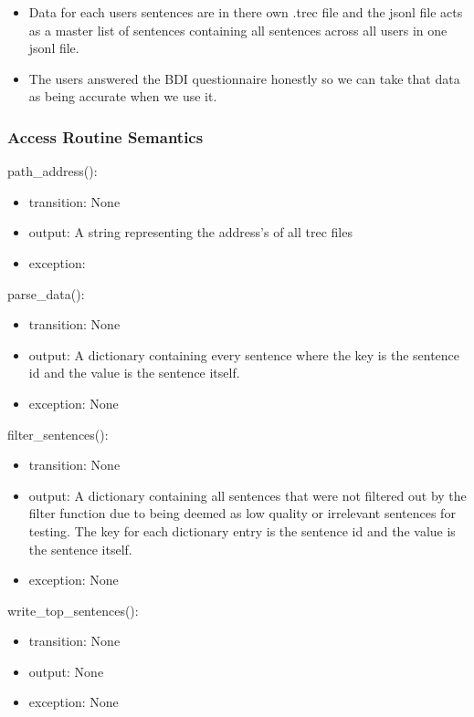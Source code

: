 \documentclass[12pt, titlepage]{article}
\begin{document}
\begin{itemize}
\item Data for each users sentences are in there own .trec file and the jsonl file acts as a master list of sentences containing all sentences across all users in one jsonl file.
\item The users answered the BDI questionnaire honestly so we can take that data as being accurate when we use it. 
\end{itemize}

\subsubsection{Access Routine Semantics}

\noindent path\_address():
\begin{itemize}
\item transition: None
\item output: A string representing the address's of all trec files
\item exception:  
\end{itemize}

\noindent parse\_data():
\begin{itemize}
\item transition: None
\item output: A dictionary containing every sentence where the key is the sentence id and the value is the sentence itself.
\item exception: None
\end{itemize}

\noindent filter\_sentences():
\begin{itemize}
\item transition: None
\item output: A dictionary containing all sentences that were not filtered out by the filter function due to being deemed as low quality or irrelevant sentences for testing. The key for each dictionary entry is the sentence id and the value is the sentence itself.
\item exception: None 
\end{itemize}

\noindent write\_top\_sentences():
\begin{itemize}
\item transition: None
\item output: None
\item exception: None
\end{itemize}
\end{document}
